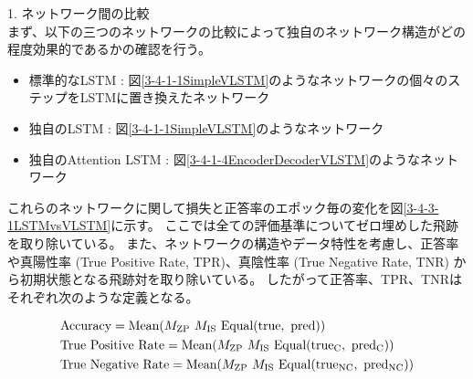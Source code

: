 1. ネットワーク間の比較\\

まず、以下の三つのネットワークの比較によって独自のネットワーク構造がどの程度効果的であるかの確認を行う。

\begin{itemize}
 \item 標準的なLSTM : 図\ref{3-4-1-1SimpleVLSTM}のようなネットワークの個々のステップをLSTMに置き換えたネットワーク
 \item 独自のLSTM : 図\ref{3-4-1-1SimpleVLSTM}のようなネットワーク
 \item 独自のAttention LSTM : 図\ref{3-4-1-4EncoderDecoderVLSTM}のようなネットワーク
\end{itemize}

これらのネットワークに関して損失と正答率のエポック毎の変化を図\ref{3-4-3-1LSTMvsVLSTM}に示す。
ここでは全ての評価基準についてゼロ埋めした飛跡を取り除いている。
また、ネットワークの構造やデータ特性を考慮し、正答率や真陽性率 (True Positive Rate, TPR)、真陰性率 (True Negative Rate, TNR) から初期状態となる飛跡対を取り除いている。
したがって正答率、TPR、TNRはそれぞれ次のような定義となる。

\begin{equation}
 \begin{split}
  &{\rm Accuracy} 
  = {\rm Mean (} M_{\rm ZP}\  M_{\rm IS}\  {\rm Equal (true,\ pred) )}\\
 &{\rm True\  Positive\  Rate} 
  = {\rm Mean (} M_{\rm ZP}\  M_{\rm IS}\  {\rm Equal (true_C,\ pred_C) )}\\
 &{\rm True\  Negative\  Rate}
  = {\rm Mean (} M_{\rm ZP}\  M_{\rm IS}\  {\rm Equal (true_{NC},\ pred_{NC}) )}\\
 \end{split}
\end{equation}

\begin{table}[htb]
 \centering
　\small
  \label{ParametersforVLSTMModel}
\end{table}

